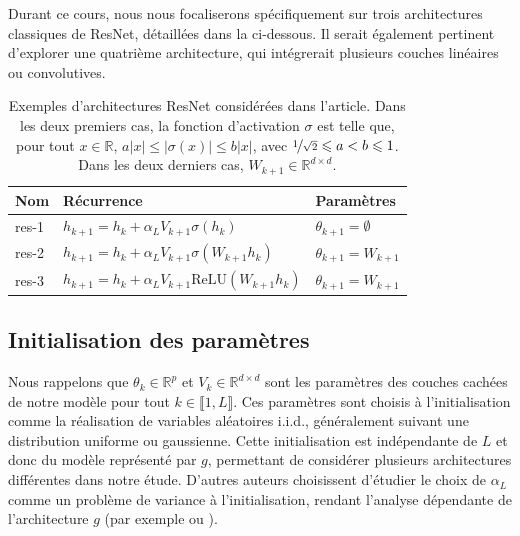 Durant ce cours, nous nous focaliserons spécifiquement sur trois architectures classiques de ResNet, détaillées dans la  ci-dessous. Il serait également pertinent d'explorer une quatrième architecture, qui intégrerait plusieurs couches linéaires ou convolutives.

\begin{table}[H]
    \centering
    \begin{tabular}{lll}
        \hline
        \textbf{Nom} & \textbf{Récurrence} & \textbf{Paramètres} \\ \hline
        res-1 & \( h_{k+1} = h_k + \alpha_L V_{k+1}\sigma(h_k) \) & \( \theta_{k+1} = \emptyset \) \\
        res-2 & \( h_{k+1} = h_k + \alpha_L V_{k+1}\sigma(W_{k+1}h_k) \) & \( \theta_{k+1} = W_{k+1} \) \\
        res-3 & \( h_{k+1} = h_k + \alpha_L V_{k+1}\text{ReLU}(W_{k+1}h_k) \) & \( \theta_{k+1} = W_{k+1} \) \\ \hline
    \end{tabular}
    \caption{Exemples d'architectures ResNet considérées dans l'article. Dans les deux premiers cas, la fonction d'activation \( \sigma \) est telle que, pour tout \( x \in \mathbb{R} \), \( a|x| \leqslant |\sigma(x)| \leqslant b|x| \), avec \( \nicefrac{1}{\sqrt{2}} \leqslant a < b \leqslant 1 \). Dans les deux derniers cas, \( W_{k+1} \in \mathbb{R}^{d \times d} \).}
    \label{tab:resnet_architectures}
\end{table}

\subsection*{Initialisation des paramètres}
Nous rappelons que $\theta_k \in \mathbb{R}^p$ et $V_k \in \mathbb{R}^{d \times d}$ sont les paramètres des couches cachées de notre modèle pour tout $k \in \llbracket 1, L \rrbracket$. Ces paramètres sont choisis à l'initialisation comme la réalisation de variables aléatoires i.i.d., généralement suivant une distribution uniforme ou gaussienne. Cette initialisation est indépendante de $L$ et donc du modèle représenté par $g$, permettant de considérer plusieurs architectures différentes dans notre étude. D'autres auteurs choisissent d'étudier le choix de $\alpha_L$ comme un problème de variance à l'initialisation, rendant l'analyse dépendante de l'architecture $ g $ (par exemple \cite{Yang2017MeanFR} ou \cite{wang2022deepnet}).

